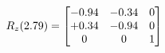\documentclass[preview]{standalone}
\begin{document}
\begin{align*}
\special{dvisvgm:raw <g id='unique000'>}R_{z}(2.79) = \begin{bmatrix}-0.94 & -0.34 & 0 \\+0.34 & -0.94 & 0 \\0 & 0 & 1\end{bmatrix}\special{dvisvgm:raw </g>}
\end{align*}
\end{document}
